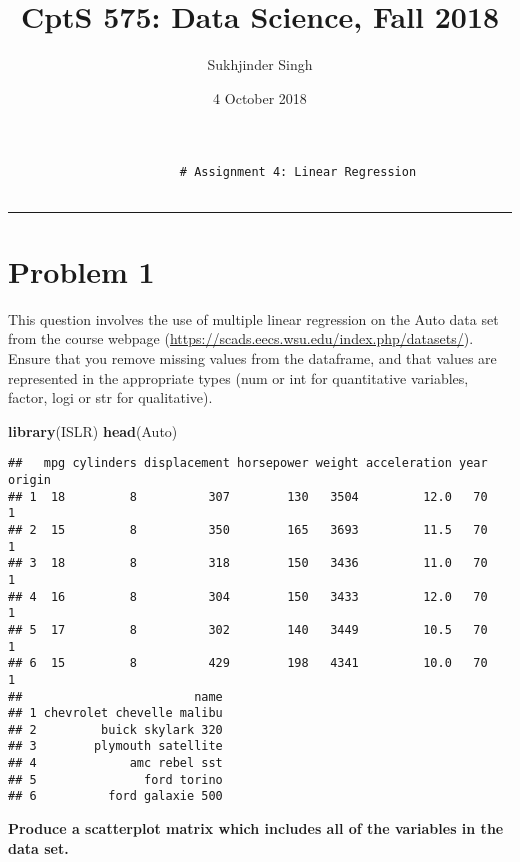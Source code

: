\documentclass[]{article}
\title{CptS 575: Data Science, Fall 2018}
\author{Sukhjinder Singh}
\date{4 October 2018}
\newenvironment{Shaded}{\begin{snugshade}}{\end{snugshade}}
\newcommand{\KeywordTok}[1]{\textcolor[rgb]{0.13,0.29,0.53}{\textbf{#1}}}
\newcommand{\NormalTok}[1]{#1}
\begin{document}
\maketitle

\begin{verbatim}
                        # Assignment 4: Linear Regression
              
\end{verbatim}

\begin{center}\rule{0.5\linewidth}{\linethickness}\end{center}

\section{Problem 1}\label{problem-1}

This question involves the use of multiple linear regression on the Auto
data set from the course webpage
(\url{https://scads.eecs.wsu.edu/index.php/datasets/}). Ensure that you
remove missing values from the dataframe, and that values are
represented in the appropriate types (num or int for quantitative
variables, factor, logi or str for qualitative).

\begin{Shaded}
\begin{Highlighting}[]
\KeywordTok{library}\NormalTok{(ISLR)}
\KeywordTok{head}\NormalTok{(Auto)}
\end{Highlighting}
\end{Shaded}

\begin{verbatim}
##   mpg cylinders displacement horsepower weight acceleration year origin
## 1  18         8          307        130   3504         12.0   70      1
## 2  15         8          350        165   3693         11.5   70      1
## 3  18         8          318        150   3436         11.0   70      1
## 4  16         8          304        150   3433         12.0   70      1
## 5  17         8          302        140   3449         10.5   70      1
## 6  15         8          429        198   4341         10.0   70      1
##                        name
## 1 chevrolet chevelle malibu
## 2         buick skylark 320
## 3        plymouth satellite
## 4             amc rebel sst
## 5               ford torino
## 6          ford galaxie 500
\end{verbatim}

\textbf{Produce a scatterplot matrix which includes all of the variables
in the data set.}
\end{document}
